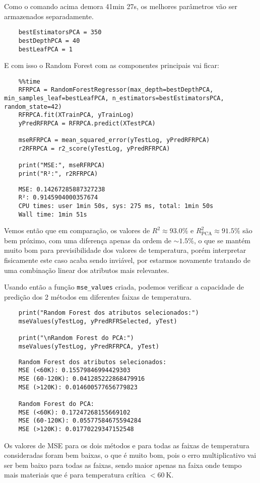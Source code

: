 Como o comando acima demora 41min 27s, os melhores parâmetros vão ser armazenados separadamente.
\begin{longlisting}
    \begin{verbatim}
    bestEstimatorsPCA = 350
    bestDepthPCA = 40
    bestLeafPCA = 1
    \end{verbatim}
\end{longlisting}

E com isso o Random Forest com as componentes principais vai ficar:
\begin{longlisting}
    \begin{verbatim}
    %%time
    RFRPCA = RandomForestRegressor(max_depth=bestDepthPCA, min_samples_leaf=bestLeafPCA, n_estimators=bestEstimatorsPCA, random_state=42)
    RFRPCA.fit(XTrainPCA, yTrainLog)
    yPredRFRPCA = RFRPCA.predict(XTestPCA)

    mseRFRPCA = mean_squared_error(yTestLog, yPredRFRPCA)
    r2RFRPCA = r2_score(yTestLog, yPredRFRPCA)

    print("MSE:", mseRFRPCA)
    print("R²:", r2RFRPCA)
    \end{verbatim}
\end{longlisting}
\begin{verbatim}
    MSE: 0.14267285887327238
    R²: 0.9145904000357674
    CPU times: user 1min 50s, sys: 275 ms, total: 1min 50s
    Wall time: 1min 51s
\end{verbatim}

Vemos então que em comparação, os valores de $R^{2} \approx 93.0\%$ e $R^{2}_{\text{PCA}} \approx 91.5\%$ são bem próximo, com uma diferença apenas da ordem de $\sim 1.5\%$, o que se mantém muito bom para previsibilidade dos valores de temperatura, porém interpretar fisicamente este caso acaba sendo inviável, por estarmos novamente tratando de uma combinação linear dos atributos mais relevantes.

Usando então a função \verb|mse_values| criada, podemos verificar a capacidade de predição dos 2 métodos em diferentes faixas de temperatura.
\begin{longlisting}
    \begin{verbatim}
    print("Random Forest dos atributos selecionados:")
    mseValues(yTestLog, yPredRFRSelected, yTest)

    print("\nRandom Forest do PCA:")
    mseValues(yTestLog, yPredRFRPCA, yTest)
    \end{verbatim}
\end{longlisting}
\begin{verbatim}
    Random Forest dos atributos selecionados:
    MSE (<60K): 0.15579846994429303
    MSE (60-120K): 0.041285222868479916
    MSE (>120K): 0.014600577656779823

    Random Forest do PCA:
    MSE (<60K): 0.17247268155669102
    MSE (60-120K): 0.05577584675594284
    MSE (>120K): 0.01770229347152548
\end{verbatim}

Os valores de MSE para os dois métodos e para todas as faixas de temperatura consideradas foram bem baixas, o que é muito bom, pois o erro multiplicativo vai ser bem baixo para todas as faixas, sendo maior apenas na faixa onde tempo mais materiais que é para temperatura crítica $<60~\text{K}$.